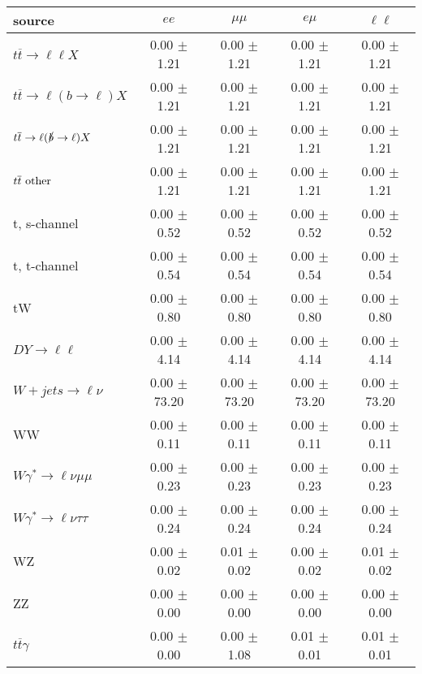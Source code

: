 \begin{tabular}{l|cccc} \hline\hline
source & $ee$ & $\mu\mu$ & $e\mu$ & $\ell\ell $ \\
\hline
$t\overline{t} \rightarrow \ell \ell X$ &  0.00 $\pm$  1.21 &  0.00 $\pm$  1.21 &  0.00 $\pm$  1.21 &  0.00 $\pm$  1.21 \\
$t\overline{t} \rightarrow \ell (b \rightarrow \ell) X$ &  0.00 $\pm$  1.21 &  0.00 $\pm$  1.21 &  0.00 $\pm$  1.21 &  0.00 $\pm$  1.21 \\
$t\overline{t} \rightarrow \ell (\slashed b \rightarrow \ell) X$ &  0.00 $\pm$  1.21 &  0.00 $\pm$  1.21 &  0.00 $\pm$  1.21 &  0.00 $\pm$  1.21 \\
        $t\overline{t}\ \rm{other}$ &  0.00 $\pm$  1.21 &  0.00 $\pm$  1.21 &  0.00 $\pm$  1.21 &  0.00 $\pm$  1.21 \\
\hline
                       t, s-channel &  0.00 $\pm$  0.52 &  0.00 $\pm$  0.52 &  0.00 $\pm$  0.52 &  0.00 $\pm$  0.52 \\
                       t, t-channel &  0.00 $\pm$  0.54 &  0.00 $\pm$  0.54 &  0.00 $\pm$  0.54 &  0.00 $\pm$  0.54 \\
                                 tW &  0.00 $\pm$  0.80 &  0.00 $\pm$  0.80 &  0.00 $\pm$  0.80 &  0.00 $\pm$  0.80 \\
\hline
         $DY \rightarrow \ell \ell$ &  0.00 $\pm$  4.14 &  0.00 $\pm$  4.14 &  0.00 $\pm$  4.14 &  0.00 $\pm$  4.14 \\
      $W+jets \rightarrow \ell \nu$ &  0.00 $\pm$ 73.20 &  0.00 $\pm$ 73.20 &  0.00 $\pm$ 73.20 &  0.00 $\pm$ 73.20 \\
                                 WW &  0.00 $\pm$  0.11 &  0.00 $\pm$  0.11 &  0.00 $\pm$  0.11 &  0.00 $\pm$  0.11 \\
\hline
$W\gamma^{*} \rightarrow \ell \nu \mu\mu$ &  0.00 $\pm$  0.23 &  0.00 $\pm$  0.23 &  0.00 $\pm$  0.23 &  0.00 $\pm$  0.23 \\
$W\gamma^{*} \rightarrow \ell \nu \tau\tau$ &  0.00 $\pm$  0.24 &  0.00 $\pm$  0.24 &  0.00 $\pm$  0.24 &  0.00 $\pm$  0.24 \\
                                 WZ &  0.00 $\pm$  0.02 &  0.01 $\pm$  0.02 &  0.00 $\pm$  0.02 &  0.01 $\pm$  0.02 \\
                                 ZZ &  0.00 $\pm$  0.00 &  0.00 $\pm$  0.00 &  0.00 $\pm$  0.00 &  0.00 $\pm$  0.00 \\
\hline
              $t\overline{t}\gamma$ &  0.00 $\pm$  0.00 &  0.00 $\pm$  1.08 &  0.01 $\pm$  0.01 &  0.01 $\pm$  0.01 \\

\end{tabular}
